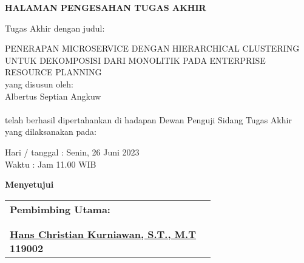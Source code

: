\vspace*{0cm}

\begin{center}		
	{\large \bfseries HALAMAN PENGESAHAN TUGAS AKHIR \\}
\end{center}
		
\vspace{2cm}

\noindent Tugas Akhir dengan judul:

\noindent PENERAPAN MICROSERVICE DENGAN HIERARCHICAL CLUSTERING UNTUK DEKOMPOSISI DARI MONOLITIK PADA ENTERPRISE RESOURCE PLANNING\\

\noindent yang disusun oleh: \\
\noindent Albertus Septian Angkuw \\
 \\

\noindent telah berhasil dipertahankan di hadapan Dewan Penguji Sidang Tugas Akhir yang dilaksanakan pada: 

\begin{tabs}{3cm}
	\noindent Hari / tanggal \tab : Senin, 26 Juni 2023 \\
	\noindent Waktu \tab : Jam 11.00 WIB
\end{tabs}

\vspace{3.2cm}
\begin{center}	
\textbf{Menyetujui} \\
\end{center}

\begin{longtable}{p{6.5cm} p{6.5cm}}
	\centering \textbf{Pembimbing Utama:}  \\
	
	\cr \\ \\
		
	\centering \textbf{ \underline{Hans Christian Kurniawan, S.T., M.T} \\ 119002} \\
	
\end{longtable}